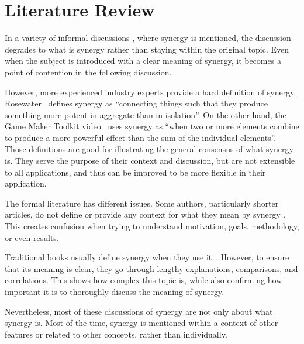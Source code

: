 \section{Literature Review}

In a variety of informal discussions \cite{agoodusern4me_what_2022,notgayyy_how_2022,whymme_how_nodate}, where synergy is mentioned, the discussion degrades to what is synergy rather than staying within the original topic. Even when the subject is introduced with a clear meaning of synergy, it becomes a point of contention in the following discussion.

However, more experienced industry experts provide a hard definition of synergy. Rosewater~\cite{rosewater_living_2013} defines synergy as ``connecting things such that they produce something more potent in aggregate than in isolation''. On the other hand, the Game Maker Toolkit video~\cite{game_maker_toolkit_how_2024} uses synergy as ``when two or more elements combine to produce a more powerful effect than the sum of the individual elements''. Those definitions are good for illustrating the general consensus of what synergy is. They serve the purpose of their context and discussion, but are not extensible to all applications, and thus can be improved to be more flexible in their application.

The formal literature has different issues. Some authors, particularly shorter articles, do not define or provide any context for what they mean by synergy \cite{franca_creativestone_2024,lee_draftrec_2022}. This creates confusion when trying to understand motivation, goals, methodology, or even results.

Traditional books usually define synergy when they use it~\cite{salen_rules_2004}. However, to ensure that its meaning is clear, they go through lengthy explanations, comparisons, and correlations. This shows how complex this topic is, while also confirming how important it is to thoroughly discuss the meaning of synergy.

Nevertheless, most of these discussions of synergy are not only about what synergy is. Most of the time, synergy is mentioned within a context of other features or related to other concepts, rather than individually.

